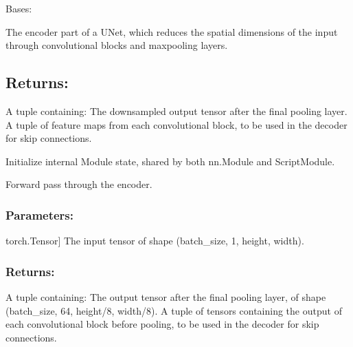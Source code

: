 \documentclass[a4paper,10pt,english]{sphinxmanual}
\begin{document}
\begin{fulllineitems}
\label{\detokenize{models:fireDiff.Models.unet.Encoder}}
\pysigstartsignatures
{}
\pysigstopsignatures
\sphinxAtStartPar
Bases: 

\sphinxAtStartPar
The encoder part of a U\sphinxhyphen{}Net, which reduces the spatial dimensions
of the input through convolutional blocks and max\sphinxhyphen{}pooling layers.


\subsection{Returns:}
\label{\detokenize{models:id10}}\begin{description}
\sphinxAtStartPar
A tuple containing:
\sphinxhyphen{} The downsampled output tensor after the final pooling layer.
\sphinxhyphen{} A tuple of feature maps from each convolutional block,
to be used in the decoder for skip connections.

\end{description}

\sphinxAtStartPar
Initialize internal Module state, shared by both nn.Module and ScriptModule.

\begin{fulllineitems}
\label{\detokenize{models:fireDiff.Models.unet.Encoder.forward}}
\pysigstartsignatures
{}
\pysigstopsignatures
\sphinxAtStartPar
Forward pass through the encoder.


\subsubsection{Parameters:}
\label{\detokenize{models:id11}}\begin{description}
\sphinxlineitem{x}{[}torch.Tensor{]}
\sphinxAtStartPar
The input tensor of shape (batch\_size, 1, height, width).

\end{description}


\subsubsection{Returns:}
\label{\detokenize{models:id12}}\begin{description}
\sphinxAtStartPar
A tuple containing:
\sphinxhyphen{} The output tensor after the final pooling layer, of shape
(batch\_size, 64, height/8, width/8).
\sphinxhyphen{} A tuple of tensors containing the output of each convolutional
block before pooling, to be used in the decoder for skip
connections.


\end{description}
\end{fulllineitems}
\end{fulllineitems}
\end{document}
